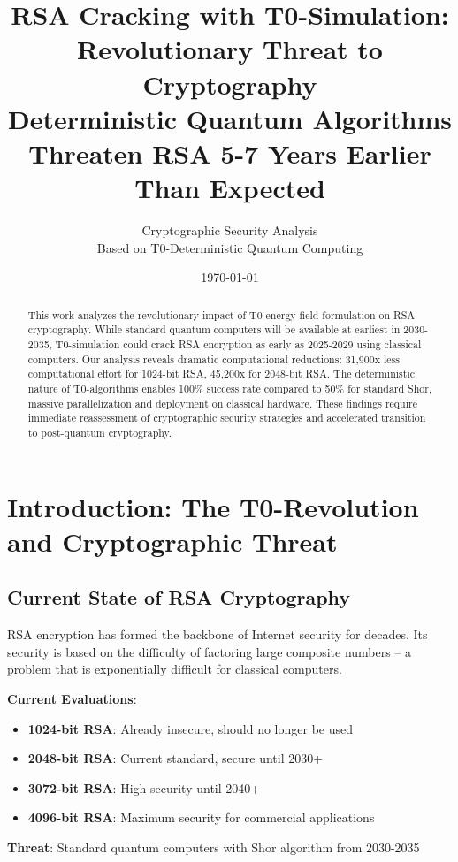 \documentclass[12pt,a4paper]{article}
\title{RSA Cracking with T0-Simulation: \\
	Revolutionary Threat to Cryptography \\
	\large Deterministic Quantum Algorithms Threaten RSA 5-7 Years Earlier Than Expected}
\author{Cryptographic Security Analysis \\
	Based on T0-Deterministic Quantum Computing}
\date{\today}
\begin{document}
	
	\maketitle
	
	\begin{abstract}
		This work analyzes the revolutionary impact of T0-energy field formulation on RSA cryptography. While standard quantum computers will be available at earliest in 2030-2035, T0-simulation could crack RSA encryption as early as 2025-2029 using classical computers. Our analysis reveals dramatic computational reductions: 31,900x less computational effort for 1024-bit RSA, 45,200x for 2048-bit RSA. The deterministic nature of T0-algorithms enables 100\% success rate compared to 50\% for standard Shor, massive parallelization and deployment on classical hardware. These findings require immediate reassessment of cryptographic security strategies and accelerated transition to post-quantum cryptography.
	\end{abstract}
	
	\tableofcontents
	\newpage
	
	\section{Introduction: The T0-Revolution and Cryptographic Threat}
	
	\subsection{Current State of RSA Cryptography}
	
	RSA encryption has formed the backbone of Internet security for decades. Its security is based on the difficulty of factoring large composite numbers -- a problem that is exponentially difficult for classical computers.
	
	\begin{tcolorbox}[colback=red!5!white,colframe=red!75!black,title=Current RSA Security Assessment]
		\textbf{Current Evaluations}:
		\begin{itemize}
			\item \textbf{1024-bit RSA}: Already insecure, should no longer be used
			\item \textbf{2048-bit RSA}: Current standard, secure until 2030+
			\item \textbf{3072-bit RSA}: High security until 2040+
			\item \textbf{4096-bit RSA}: Maximum security for commercial applications
		\end{itemize}
		
		\textbf{Threat}: Standard quantum computers with Shor algorithm from 2030-2035
	\end{tcolorbox}
	
\end{document}
